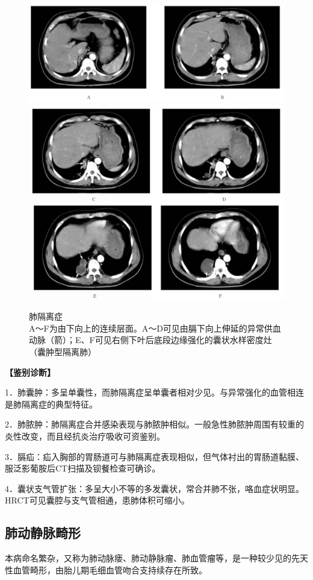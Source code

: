\begin{figure}[!htbp]
 \centering
 \includegraphics[width=.7\textwidth,height=\textheight,keepaspectratio]{./images/Image00191.jpg}
 \includegraphics[width=.7\textwidth,height=\textheight,keepaspectratio]{./images/Image00192.jpg}
 \captionsetup{justification=centering}
 \caption{肺隔离症\\{\small A～F为由下向上的连续层面。A～D可见由膈下向上伸延的异常供血动脉（箭）；E、F可见右侧下叶后底段边缘强化的囊状水样密度灶（囊肿型隔离肺）}}
 \label{fig9-8}
  \end{figure} 

\textbf{【鉴别诊断】}

1．肺囊肿：多呈单囊性，而肺隔离症呈单囊者相对少见。与异常强化的血管相连是肺隔离症的典型特征。

2．肺脓肿：肺隔离症合并感染表现与肺脓肿相似。一般急性肺脓肿周围有较重的炎性改变，而且经抗炎治疗吸收可资鉴别。

3．膈疝：疝入胸部的胃肠道可与肺隔离症表现相似，但气体衬出的胃肠道黏膜、服泛影葡胺后CT扫描及钡餐检查可确诊。

4．囊状支气管扩张：多呈大小不等的多发囊状，常合并肺不张，咯血症状明显。HRCT可见囊腔与支气管相通，患肺体积可缩小。

\subsection{肺动静脉畸形}

本病命名繁杂，又称为肺动脉瘘、肺动静脉瘤、肺血管瘤等，是一种较少见的先天性血管畸形，由胎儿期毛细血管吻合支持续存在所致。

